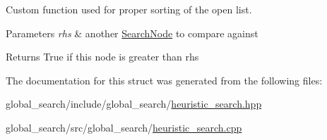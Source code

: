 Custom function used for proper sorting of the open list. 


\begin{DoxyParams}{Parameters}
{\em rhs} & another \hyperlink{structhsearch_1_1SearchNode}{Search\+Node} to compare against \\
\hline
\end{DoxyParams}
\begin{DoxyReturn}{Returns}
True if this node is greater than rhs 
\end{DoxyReturn}


The documentation for this struct was generated from the following files\+:\begin{DoxyCompactItemize}
\item 
global\+\_\+search/include/global\+\_\+search/\hyperlink{heuristic__search_8hpp}{heuristic\+\_\+search.\+hpp}\item 
global\+\_\+search/src/global\+\_\+search/\hyperlink{heuristic__search_8cpp}{heuristic\+\_\+search.\+cpp}\end{DoxyCompactItemize}
